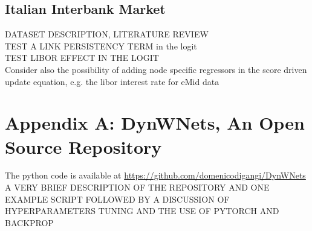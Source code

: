 \documentclass[a4paper,12pt]{article}
\begin{document}
\subsection{Italian Interbank Market}
DATASET DESCRIPTION, LITERATURE REVIEW\\
TEST A LINK PERSISTENCY TERM in the logit\\
TEST LIBOR EFFECT IN THE LOGIT\\
Consider also the  possibility of adding node specific regressors in the score driven update equation, e.g. the libor interest rate for eMid data 


\section{Appendix A: DynWNets, An Open Source Repository }\label{sec:appendix_code} 
The python code is available at \url{https://github.com/domenicodigangi/DynWNets}\\
A VERY BRIEF DESCRIPTION OF THE REPOSITORY AND ONE EXAMPLE SCRIPT FOLLOWED BY A DISCUSSION OF HYPERPARAMETERS TUNING AND THE USE OF PYTORCH AND BACKPROP
  
\end{document}
